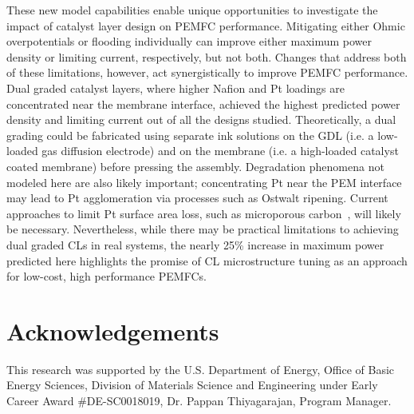 \documentclass[final,3p,times,twocolumn]{elsarticle}    %
\begin{document}
These new model capabilities enable unique opportunities to investigate the impact of catalyst layer design on PEMFC performance. Mitigating either Ohmic overpotentials or flooding individually can improve either maximum power density or limiting current, respectively, but not both. Changes that address both of these limitations, however, act synergistically to improve PEMFC performance. Dual graded catalyst layers, where higher Nafion and Pt loadings are concentrated near the membrane interface, achieved the highest predicted power density and limiting current out of all the designs studied. Theoretically, a dual grading could be fabricated using separate ink solutions on the GDL (i.e. a low-loaded gas diffusion electrode) and on the membrane (i.e. a high-loaded catalyst coated membrane) before pressing the assembly. Degradation phenomena not modeled here are also likely important; concentrating Pt near the PEM interface may lead to Pt agglomeration via processes such as Ostwalt ripening. Current approaches to limit Pt surface area loss, such as microporous carbon~\cite{bib:padgett_2019, bib:ko_2021}, will likely be necessary. Nevertheless, while there may be practical limitations to achieving dual graded CLs in real systems, the nearly 25\% increase in maximum power predicted here highlights the promise of CL microstructure tuning as an approach for low-cost, high performance PEMFCs.


\section{Acknowledgements}

This research was supported by the U.S. Department of Energy, Office of Basic Energy Sciences, Division of Materials Science and Engineering under Early Career Award \#DE-SC0018019, Dr. Pappan Thiyagarajan, Program Manager.




\end{document}

